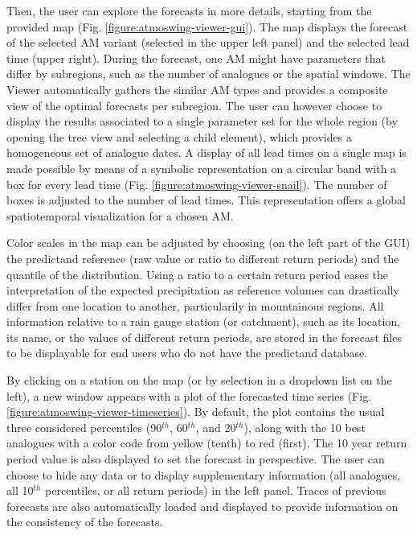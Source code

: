 \documentclass[review]{elsarticle}
\begin{document}
Then, the user can explore the forecasts in more details, starting from the provided map (Fig. \ref{figure:atmoswing-viewer-gui}). The map displays the forecast of the selected AM variant (selected in the upper left panel) and the selected lead time (upper right). During the forecast, one AM might have parameters that differ by subregions, such as the number of analogues or the spatial windows. The Viewer automatically gathers the similar AM types and provides a composite view of the optimal forecasts per subregion. The user can however choose to display the results associated to a single parameter set for the whole region (by opening the tree view and selecting a child element), which provides a homogeneous set of analogue dates. A display of all lead times on a single map is made possible by means of a symbolic representation on a circular band with a box for every lead time (Fig. \ref{figure:atmoswing-viewer-snail}). The number of boxes is adjusted to the number of lead times. This representation offers a global spatiotemporal visualization for a chosen AM.

Color scales in the map can be adjusted by choosing (on the left part of the GUI) the predictand reference (raw value or ratio to different return periods) and the quantile of the distribution. Using a ratio to a certain return period eases the interpretation of the expected precipitation as reference volumes can drastically differ from one location to another, particularily in mountainous regions. All information relative to a rain gauge station (or catchment), such as its location, its name, or the values of different return periods, are stored in the forecast files to be displayable for end users who do not have the predictand database.

By clicking on a station on the map (or by selection in a dropdown list on the left), a new window appears with a plot of the forecasted time series (Fig. \ref{figure:atmoswing-viewer-timeseries}). By default, the plot contains the usual three considered percentiles (90$^{th}$, 60$^{th}$, and 20$^{th}$), along with the 10 best analogues with a color code from yellow (tenth) to red (first). The 10 year return period value is also displayed to set the forecast in perspective. The user can choose to hide any data or to display supplementary information (all analogues, all 10$^{th}$ percentiles, or all return periods) in the left panel. Traces of previous forecasts are also automatically loaded and displayed to provide information on the consistency of the forecasts. 
\end{document}
